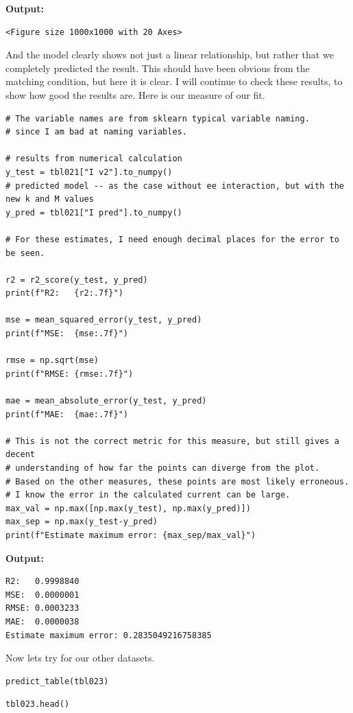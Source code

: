 \documentclass{article}
\begin{document}
\textbf{Output:}\begin{verbatim}
<Figure size 1000x1000 with 20 Axes>
\end{verbatim}

And the model clearly shows not just a linear relationship, but rather that we completely predicted the result. This should have been obvious from the matching condition, but here it is clear. I will continue to check these results, to show how good the results are. Here is our measure of our fit.

\begin{lstlisting}
# The variable names are from sklearn typical variable naming.
# since I am bad at naming variables.

# results from numerical calculation
y_test = tbl021["I v2"].to_numpy()   
# predicted model -- as the case without ee interaction, but with the new k and M values
y_pred = tbl021["I pred"].to_numpy() 

# For these estimates, I need enough decimal places for the error to be seen.

r2 = r2_score(y_test, y_pred)
print(f"R2:   {r2:.7f}")

mse = mean_squared_error(y_test, y_pred)
print(f"MSE:  {mse:.7f}")

rmse = np.sqrt(mse)
print(f"RMSE: {rmse:.7f}")

mae = mean_absolute_error(y_test, y_pred)
print(f"MAE:  {mae:.7f}")

# This is not the correct metric for this measure, but still gives a decent
# understanding of how far the points can diverge from the plot. 
# Based on the other measures, these points are most likely erroneous.
# I know the error in the calculated current can be large.
max_val = np.max([np.max(y_test), np.max(y_pred)])
max_sep = np.max(y_test-y_pred)
print(f"Estimate maximum error: {max_sep/max_val}")\end{lstlisting}

\textbf{Output:}\begin{verbatim}
R2:   0.9998840
MSE:  0.0000001
RMSE: 0.0003233
MAE:  0.0000038
Estimate maximum error: 0.2835049216758385

\end{verbatim}

Now lets try for our other datasets.

\begin{lstlisting}
predict_table(tbl023)\end{lstlisting}

\begin{lstlisting}
tbl023.head()\end{lstlisting}
\end{document}
